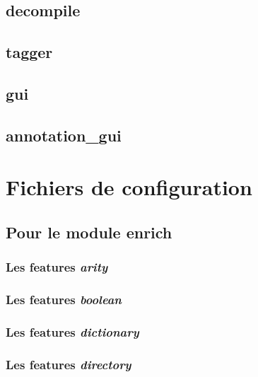 \documentclass[12pt]{article}
\begin{document}
        \subsection{decompile}
        

        \subsection{tagger}
        

        \subsection{gui}
        

        \subsection{annotation\_gui}
        
    
    \section{Fichiers de configuration}

        \subsection{Pour le module enrich}
        

            \subsubsection{Les features \textit{arity}}
            

            \subsubsection{Les features \textit{boolean}}
            

            \subsubsection{Les features \textit{dictionary}}
            

            \subsubsection{Les features \textit{directory}}
            
\end{document}
